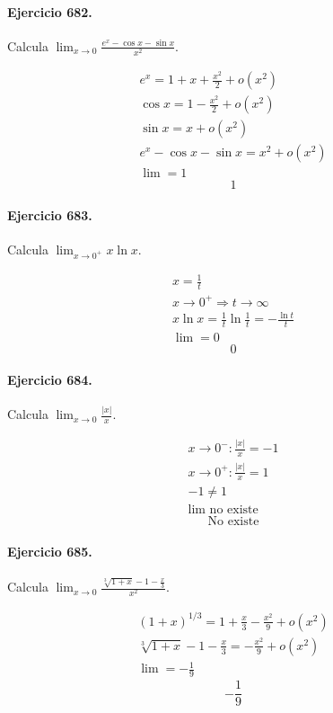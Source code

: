 \documentclass[11pt,a4paper]{article}
\begin{document}
\paragraph{Ejercicio 682.} Calcula $\displaystyle \lim_{x\to0}\frac{e^x-\cos x-\sin x}{x^2}$.

\[
\begin{aligned}
e^x=1+x+\frac{x^2}{2}+o(x^2)\\
\cos x=1-\frac{x^2}{2}+o(x^2)\\
\sin x=x+o(x^2)\\
e^x-\cos x-\sin x=x^2+o(x^2)\\
\lim=1
\end{aligned}
\]
\[\boxed{1}\]


\paragraph{Ejercicio 683.} Calcula $\displaystyle \lim_{x\to0^+}x\ln x$.

\[
\begin{aligned}
x=\frac1t\\
x\to0^+\Rightarrow t\to\infty\\
x\ln x=\frac1t\ln\frac1t=-\frac{\ln t}{t}\\
\lim=0
\end{aligned}
\]
\[\boxed{0}\]


\paragraph{Ejercicio 684.} Calcula $\displaystyle \lim_{x\to0}\frac{|x|}{x}$.

\[
\begin{aligned}
x\to0^-:\frac{|x|}{x}=-1\\
x\to0^+:\frac{|x|}{x}=1\\
-1\ne1\\
\lim\text{{ no existe}}
\end{aligned}
\]
\[\boxed{\text{{No existe}}}\]


\paragraph{Ejercicio 685.} Calcula $\displaystyle \lim_{x\to0}\frac{\sqrt[3]{1+x}-1-\frac{x}{3}}{x^2}$.

\[
\begin{aligned}
(1+x)^{1/3}=1+\frac{x}{3}-\frac{x^2}{9}+o(x^2)\\
\sqrt[3]{1+x}-1-\frac{x}{3}=-\frac{x^2}{9}+o(x^2)\\
\lim=-\frac19
\end{aligned}
\]
\[\boxed{-\frac19}\]
\end{document}
